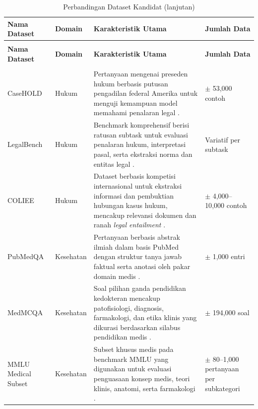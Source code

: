 \small
\begin{longtable}{|>{\raggedright\arraybackslash}p{2.2cm}|>{\raggedright\arraybackslash}p{1.5cm}|>{\raggedright\arraybackslash}p{5.9cm}|>{\raggedright\arraybackslash}p{2.3cm}|}
\caption{Perbandingan Dataset Kandidat}
\label{tbl:dataset_kandidat} \\
\hline
\textbf{Nama Dataset} &
\textbf{Domain} &
\textbf{Karakteristik Utama} &
\textbf{Jumlah Data} \\
\hline
\endfirsthead

\caption[]{Perbandingan Dataset Kandidat (lanjutan)} \\
\hline
\textbf{Nama Dataset} &
\textbf{Domain} &
\textbf{Karakteristik Utama} &
\textbf{Jumlah Data} \\
\hline
\endhead

\hline
\multicolumn{4}{r}{\textit{Bersambung ke halaman berikutnya}} \\
\endfoot

\hline
\endlastfoot

CaseHOLD &
Hukum &
Pertanyaan mengenai preseden hukum berbasis putusan pengadilan federal Amerika untuk menguji kemampuan model memahami penalaran legal \parencite{casehold}. &
$\pm$ 53{,}000 contoh
\\ \hline

LegalBench &
Hukum &
Benchmark komprehensif berisi ratusan subtask untuk evaluasi penalaran hukum, interpretasi pasal, serta ekstraksi norma dan entitas legal \parencite{legalbench}. &
Variatif per subtask
\\ \hline

COLIEE &
Hukum &
Dataset berbasis kompetisi internasional untuk ekstraksi informasi dan pembuktian hubungan kasus hukum, mencakup relevansi dokumen dan ranah \textit{legal entailment} \parencite{coliee}. &
$\pm$ 4{,}000--10{,}000 contoh
\\ \hline

PubMedQA &
Kesehatan &
Pertanyaan berbasis abstrak ilmiah dalam basis PubMed dengan struktur tanya jawab faktual serta anotasi oleh pakar domain medis \parencite{pubmedqa}. &
$\pm$ 1{,}000 entri
\\ \hline

MedMCQA &
Kesehatan &
Soal pilihan ganda pendidikan kedokteran mencakup patofisiologi, diagnosis, farmakologi, dan etika klinis yang dikurasi berdasarkan silabus pendidikan medis \parencite{medmcqa}. &
$\pm$ 194{,}000 soal
\\ \hline

MMLU Medical Subset &
Kesehatan &
Subset khusus medis pada benchmark MMLU yang digunakan untuk evaluasi penguasaan konsep medis, teori klinis, anatomi, serta farmakologi \parencite{mmlu}. &
$\pm$ 80--1{,}000 pertanyaan per subkategori
\\ \hline


\end{longtable}
